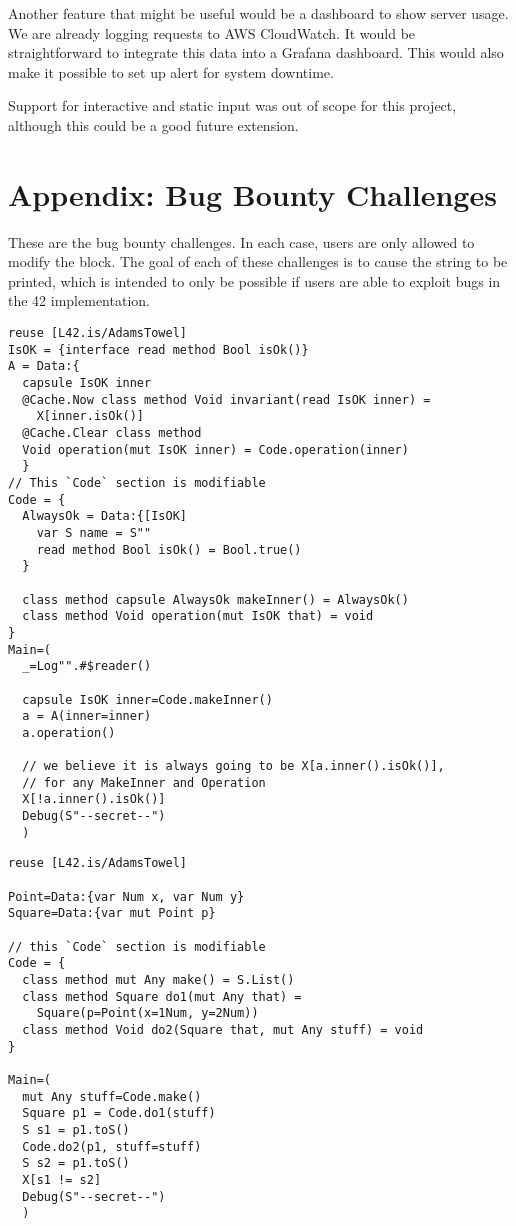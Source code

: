 Another feature that might be useful would be a dashboard to show server usage. We are already logging requests to AWS CloudWatch. It would be straightforward to integrate this data into a Grafana dashboard. This would also make it possible to set up alert for system downtime.

Support for interactive and static input was out of scope for this project, although this could be a good future extension.

\chapter{Appendix: Bug Bounty Challenges}

These are the bug bounty challenges. In each case, users are only allowed to modify the  block. The goal of each of these challenges is to cause the  string to be printed, which is intended to only be possible if users are able to exploit bugs in the 42 implementation.

\begin{lstlisting}[caption=Bug Bounty Challenge \#1]
reuse [L42.is/AdamsTowel]
IsOK = {interface read method Bool isOk()}
A = Data:{
  capsule IsOK inner
  @Cache.Now class method Void invariant(read IsOK inner) =
    X[inner.isOk()]
  @Cache.Clear class method
  Void operation(mut IsOK inner) = Code.operation(inner)
  }
// This `Code` section is modifiable
Code = {
  AlwaysOk = Data:{[IsOK]
    var S name = S""
    read method Bool isOk() = Bool.true()
  }

  class method capsule AlwaysOk makeInner() = AlwaysOk()
  class method Void operation(mut IsOK that) = void
}
Main=(
  _=Log"".#$reader()

  capsule IsOK inner=Code.makeInner()
  a = A(inner=inner)
  a.operation()

  // we believe it is always going to be X[a.inner().isOk()],
  // for any MakeInner and Operation
  X[!a.inner().isOk()]
  Debug(S"--secret--")
  )
\end{lstlisting}

\begin{lstlisting}[caption=Bug Bounty Challenge \#2]
reuse [L42.is/AdamsTowel]

Point=Data:{var Num x, var Num y}
Square=Data:{var mut Point p}

// this `Code` section is modifiable
Code = {
  class method mut Any make() = S.List()
  class method Square do1(mut Any that) =
    Square(p=Point(x=1Num, y=2Num))
  class method Void do2(Square that, mut Any stuff) = void
}

Main=(
  mut Any stuff=Code.make()
  Square p1 = Code.do1(stuff)
  S s1 = p1.toS()
  Code.do2(p1, stuff=stuff)
  S s2 = p1.toS()
  X[s1 != s2]
  Debug(S"--secret--")
  )
\end{lstlisting}

